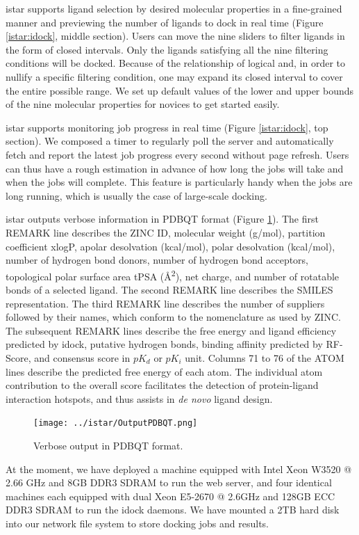 istar supports ligand selection by desired molecular properties in a fine-grained manner and previewing the number of ligands to dock in real time (Figure \ref{istar:idock}, middle section). Users can move the nine sliders to filter ligands in the form of closed intervals. Only the ligands satisfying all the nine filtering conditions will be docked. Because of the relationship of logical and, in order to nullify a specific filtering condition, one may expand its closed interval to cover the entire possible range. We set up default values of the lower and upper bounds of the nine molecular properties for novices to get started easily.

istar supports monitoring job progress in real time (Figure \ref{istar:idock}, top section). We composed a timer to regularly poll the server and automatically fetch and report the latest job progress every second without page refresh. Users can thus have a rough estimation in advance of how long the jobs will take and when the jobs will complete. This feature is particularly handy when the jobs are long running, which is usually the case of large-scale docking.

istar outputs verbose information in PDBQT format (Figure \ref{istar:OutputPDBQT}). The first REMARK line describes the ZINC ID, molecular weight (g/mol), partition coefficient xlogP, apolar desolvation (kcal/mol), polar desolvation (kcal/mol), number of hydrogen bond donors, number of hydrogen bond acceptors, topological polar surface area tPSA (\AA\textsuperscript{2}), net charge, and number of rotatable bonds of a selected ligand. The second REMARK line describes the SMILES representation. The third REMARK line describes the number of suppliers followed by their names, which conform to the nomenclature as used by ZINC. The subsequent REMARK lines describe the free energy and ligand efficiency predicted by idock, putative hydrogen bonds, binding affinity predicted by RF-Score, and consensus score in $pK_d$ or $pK_i$ unit. Columns 71 to 76 of the ATOM lines describe the predicted free energy of each atom. The individual atom contribution to the overall score facilitates the detection of protein-ligand interaction hotspots, and thus assists in \textit{de novo} ligand design.

\begin{figure}
\centering
\texttt{[image: ../istar/OutputPDBQT.png]}
\caption{Verbose output in PDBQT format.}
\label{istar:OutputPDBQT}
\end{figure}

At the moment, we have deployed a machine equipped with Intel Xeon W3520 @ 2.66 GHz and 8GB DDR3 SDRAM to run the web server, and four identical machines each equipped with dual Xeon E5-2670 @ 2.6GHz and 128GB ECC DDR3 SDRAM to run the idock daemons. We have mounted a 2TB hard disk into our network file system to store docking jobs and results.


